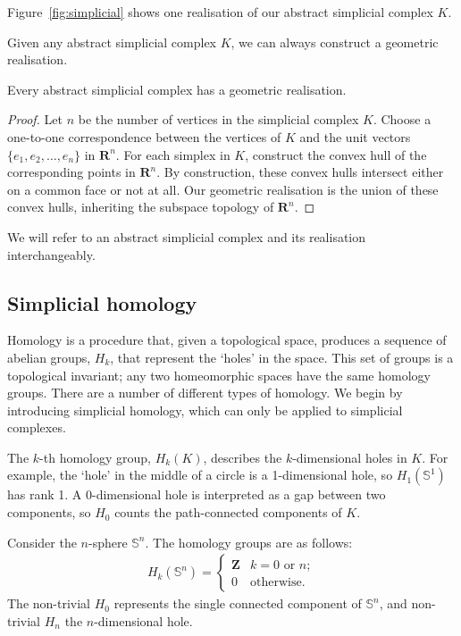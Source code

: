 \begin{example}
Figure~\ref{fig:simplicial} shows one realisation of our abstract simplicial complex $K$.
\end{example}

Given any abstract simplicial complex $K$, we can always construct a geometric realisation.

\begin{theorem}
Every abstract simplicial complex has a geometric realisation.
\end{theorem}
\begin{proof}
Let $n$ be the number of vertices in the simplicial complex $K$. Choose a one-to-one correspondence between the vertices of $K$ and the unit vectors $\{e_1, e_2, \dots, e_n\}$ in $\mathbf{R}^n$. For each simplex in $K$, construct the convex hull of the corresponding points in $\mathbf{R}^n$. By construction, these convex hulls intersect either on a common face or not at all. Our geometric realisation is the union of these convex hulls, inheriting the subspace topology of $\mathbf{R}^n$.
\end{proof}

We will refer to an abstract simplicial complex and its realisation interchangeably.

\subsection{Simplicial homology}

Homology is a procedure that, given a topological space, produces a sequence of abelian groups, $H_k$, that represent the `holes' in the space. This set of groups is a topological invariant; any two homeomorphic spaces have the same homology groups. There are a number of different types of homology. We begin by introducing simplicial homology, which can only be applied to simplicial complexes.

The $k$-th homology group, $H_k(K)$, describes the $k$-dimensional holes in $K$. For example, the `hole' in the middle of a circle is a 1-dimensional hole, so $H_1(\mathbb{S}^1)$ has rank 1. A 0-dimensional hole is interpreted as a gap between two components, so $H_0$ counts the path-connected components of $K$.

\begin{example}
Consider the $n$-sphere $\mathbb{S}^n$. The homology groups are as follows:
\begin{align*}
  H_k(\mathbb{S}^n) = \begin{cases}
    \mathbf{Z} & k = 0 \text{ or } n ;\\
    0 & \text{otherwise.}
\end{cases}
\end{align*}
The non-trivial $H_0$ represents the single connected component of $\mathbb{S}^n$, and non-trivial $H_n$ the $n$-dimensional hole.
\end{example}

